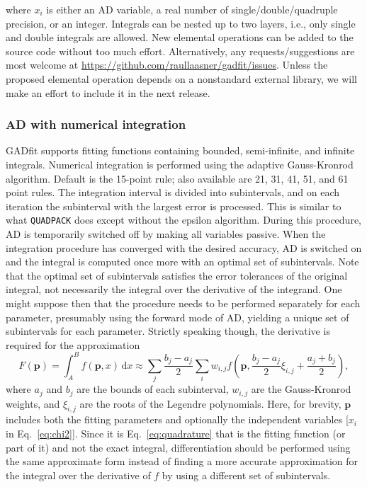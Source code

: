 \documentclass{article}
\newcommand{\D}{\,\textrm{d}}
\begin{document}
where $x_i$ is either an AD variable, a real number of single/double/quadruple precision, or an integer. Integrals can be nested up to two layers, i.e., only single and double integrals are allowed. New elemental operations can be added to the source code without too much effort. Alternatively, any requests/suggestions are most welcome at \url{https://github.com/raullaasner/gadfit/issues}. Unless the proposed elemental operation depends on a nonstandard external library, we will make an effort to include it in the next release.

\subsubsection{AD with numerical integration}

GADfit supports fitting functions containing bounded, semi-infinite, and infinite integrals. Numerical integration is performed using the adaptive Gauss-Kronrod algorithm. Default is the 15-point rule; also available are 21, 31, 41, 51, and 61 point rules. The integration interval is divided into subintervals, and on each iteration the subinterval with the largest error is processed. This is similar to what \texttt{QUADPACK} does except without the epsilon algorithm. During this procedure, AD is temporarily switched off by making all variables passive. When the integration procedure has converged with the desired accuracy, AD is switched on and the integral is computed once more with an optimal set of subintervals. Note that the optimal set of subintervals satisfies the error tolerances of the original integral, not necessarily the integral over the derivative of the integrand. One might suppose then that the procedure needs to be performed separately for each parameter, presumably using the forward mode of AD, yielding a unique set of subintervals for each parameter. Strictly speaking though, the derivative is required for the approximation
\begin{equation}
  \label{eq:quadrature}
  F(\bm p) = \int_A^B f(\bm p,x) \D x \approx \sum_j \frac{b_j-a_j}{2}\sum_i
  w_{i,j} f \left( \bm p, \frac{b_j-a_j}{2}\xi_{i,j} + \frac{a_j+b_j}{2}
  \right),
\end{equation}
where $a_j$ and $b_j$ are the bounds of each subinterval, $w_{i,j}$ are the Gauss-Kronrod weights, and $\xi_{i,j}$ are the roots of the Legendre polynomials. Here, for brevity, $\bm p$ includes both the fitting parameters and optionally the independent variables [$x_i$ in Eq.~\eqref{eq:chi2}]. Since it is Eq.~\eqref{eq:quadrature} that is the fitting function (or part of it) and not the exact integral, differentiation should be performed using the same approximate form instead of finding a more accurate approximation for the integral over the derivative of $f$ by using a different set of subintervals.
\end{document}

